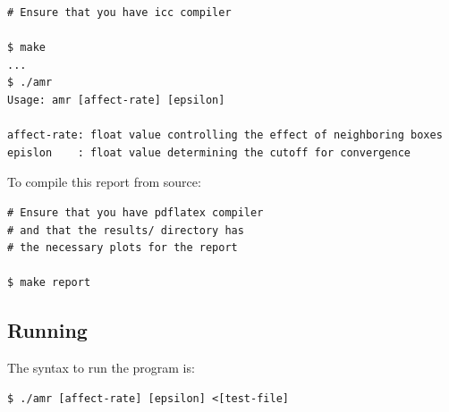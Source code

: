 \documentclass{article}
\begin{document}
\begin{lstlisting}[style=DOS]
# Ensure that you have icc compiler

$ make
...
$ ./amr
Usage: amr [affect-rate] [epsilon]

affect-rate: float value controlling the effect of neighboring boxes
epislon    : float value determining the cutoff for convergence
\end{lstlisting}

To compile this report from source:

\begin{lstlisting}[style=DOS]
# Ensure that you have pdflatex compiler
# and that the results/ directory has
# the necessary plots for the report

$ make report
\end{lstlisting}

\subsection*{Running}
\label{subsec:running}

The syntax to run the program is:

\begin{lstlisting}[style=DOS]
$ ./amr [affect-rate] [epsilon] <[test-file]
\end{lstlisting}
\end{document}
